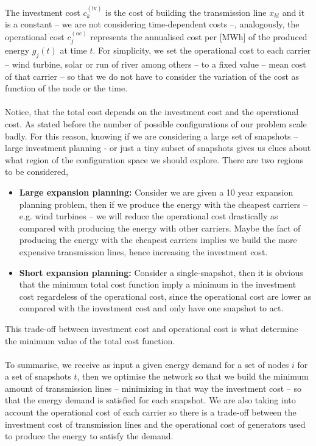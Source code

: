 The investment cost $c_{k}^{(\text{iv})}$ is the cost of building the transmission line $x_{kl}$ and it is a constant -- we are not considering time-dependent costs --, analogously, the operational cost $c_{j}^{(\text{oc})}$ represents the annualised cost per [MWh] of the produced energy $g_{j}(t)$ at time $t$. For simplicity, we set the operational cost to each carrier -- wind turbine, solar or run of river among others -- to a fixed value -- mean cost of that carrier -- so that we do not have to consider the variation of the cost as function of the node or the time.\\\\
Notice, that the total cost depends on the investment cost and the operational cost. As stated before the number of possible configurations of our problem scale badly. For this reason, knowing if we are considering a large set of snapshots -- large investment planning - or just a tiny subset of snapshots gives us clues about what region of the configuration space we should explore. There are two regions to be considered,
\begin{itemize}
    \item \textbf{Large expansion planning:} Consider we are given a 10 year expansion planning problem, then if we produce the energy with the  cheapest carriers -- e.g. wind turbines -- we will reduce the operational cost drastically as compared with producing the energy with other carriers. Maybe the fact of producing the energy with the cheapest carriers implies we build the more expensive transmission lines, hence increasing the investment cost.
    \item \textbf{Short expansion planning:} Consider a single-snapshot, then it is obvious that the minimum total cost function imply a minimum in the investment cost regardeless of the operational cost, since the operational cost are lower as compared with the investment cost and only have one snapshot to act.
\end{itemize}
This trade-off between investment cost and operational cost is what determine the minimum value of the total cost function.\\\\
To summarise, we receive as input a given energy demand for a set of nodes $i$ for a set of snapshots $t$, then we optimise the network so that we build the minimum amount of transmission lines -- minimizing in that way the investment cost -- so that the energy demand is satisfied for each snapshot. We are also taking into account the operational cost of each carrier so there is a trade-off between the investment cost of transmission lines and the operational cost of generators used to produce the energy to satisfy the demand.
